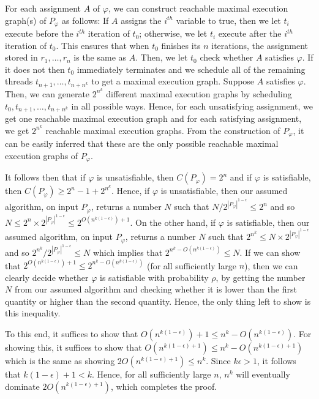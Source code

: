 For each assignment $A$ of $\varphi$, we can construct reachable maximal execution graph(s) of $P_\varphi$ as follows: If $A$ assigns the $i^{th}$ variable to true, then we let $t_i$
execute before the $i^{th}$ iteration of $t_0$; otherwise, we let $t_i$ execute after
the $i^{th}$ iteration of $t_0$. This ensures that when $t_0$ finishes its $n$ iterations,
the assignment stored in $r_1,\dots,r_n$ is the same as $A$. Then, we let
$t_0$ check whether $A$ satisfies $\varphi$. If it does not then $t_0$ immediately terminates and we schedule all of the remaining threads $t_{n+1},\dots,t_{n+n^k}$
to get a maximal execution graph. Suppose $A$ satisfies $\varphi$. Then, we can generate $2^{n^k}$ different maximal execution graphs by scheduling $t_0,t_{n+1},\dots,t_{n+n^k}$ in all possible ways.
Hence, for each unsatisfying assignment, we get one reachable maximal execution graph
and for each satisfying assignment, we get $2^{n^k}$ reachable maximal execution graphs.
From the construction of $P_\varphi$, it can be easily inferred that these are the only possible reachable maximal execution graphs of $P_\varphi$.


It follows then that if $\varphi$ is unsatisfiable, then $C(P_\varphi) = 2^n$
and if $\varphi$ is satisfiable, then $C(P_\varphi) \ge 2^n - 1 + 2^{n^k}$.
Hence, if $\varphi$ is unsatisfiable, then our assumed algorithm, on input $P_\varphi$, returns a number $N$ such that $N/2^{|P_\varphi|^{1-\epsilon}} \le 2^n$ and so $N \le 2^n \times 2^{|P_\varphi|^{1-\epsilon}} \le
2^{O(n^{k(1-\epsilon)}) + 1}$. On the other hand, if $\varphi$ is satisfiable,
then our assumed algorithm, on input $P_\varphi$,
returns a number $N$ such that $2^{n^k} \le N \times 2^{|P_\varphi|^{1-\epsilon}}$
and so $2^{n^k}/2^{|P_\varphi|^{1-\epsilon}} \le N$ which implies that
$2^{n^k-O(n^{k(1-\epsilon)})} \le N$.
If we can show that $2^{O(n^{k(1-\epsilon)}) + 1} \le 2^{n^k-O(n^{k(1-\epsilon)})}$ (for all sufficiently large $n$), then we can clearly decide whether $\varphi$ is satisfiable
with probability $\rho$, by getting the number $N$ from our assumed algorithm and checking whether it is lower than the first quantity
or higher than the second quantity. Hence, the only thing left to show is this inequality.

To this end, it suffices to show that $O(n^{k(1-\epsilon)}) + 1 \le n^k-O(n^{k(1-\epsilon)})$. For showing this, it suffices to show that $O(n^{k(1-\epsilon)+1}) \le n^k - O(n^{k(1-\epsilon)+1})$ which is the same as showing
$2O(n^{k(1-\epsilon)+1}) \le n^k$. Since $k\epsilon > 1$,
it follows that $k(1-\epsilon) + 1 < k$. Hence, for all sufficiently large $n$,
$n^k$ will eventually dominate $2O(n^{k(1-\epsilon)+1})$, which completes the proof.

